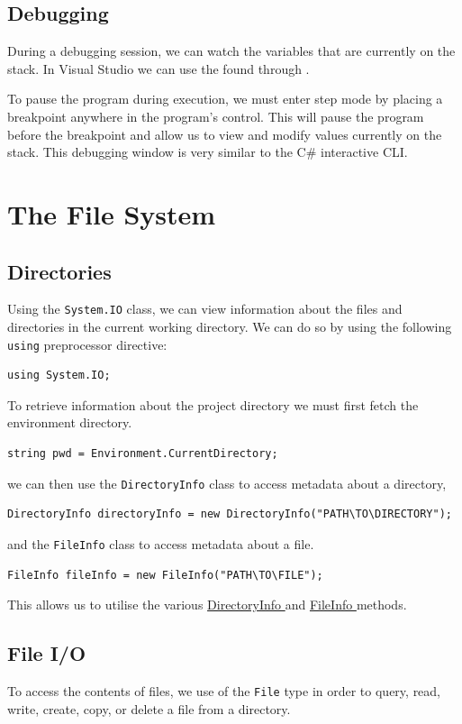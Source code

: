 \documentclass{article}
\begin{document}
\subsection{Debugging}
During a debugging session, we can watch the variables that are currently on the stack.
In Visual Studio we can use the  found through
.

To pause the program during execution, we must enter step mode by placing a breakpoint
anywhere in the program's control. This will pause the program before the breakpoint
and allow us to view and modify values currently on the stack. This debugging window
is very similar to the C\# interactive CLI. %
\section{The File System}
\subsection{Directories}
Using the \lstinline{System.IO} class, we can view information about the files and directories in
the current working directory. We can do so by using the following \lstinline{using} preprocessor directive:
\begin{lstlisting}[numbers=none]
using System.IO;
\end{lstlisting}
To retrieve information about the project directory we must first fetch the environment directory.
\begin{lstlisting}[numbers=none]
string pwd = Environment.CurrentDirectory;
\end{lstlisting}
we can then use the \lstinline{DirectoryInfo} class to access metadata about a directory,
\begin{lstlisting}[numbers=none]
DirectoryInfo directoryInfo = new DirectoryInfo("PATH\TO\DIRECTORY");
\end{lstlisting}
and the \lstinline{FileInfo} class to access metadata about a file.
\begin{lstlisting}[numbers=none]
FileInfo fileInfo = new FileInfo("PATH\TO\FILE");
\end{lstlisting}
This allows us to utilise the various \href{https://docs.microsoft.com/en-us/dotnet/api/system.io.directoryinfo?view=net-6.0#methods}{DirectoryInfo }
and \href{https://docs.microsoft.com/en-us/dotnet/api/system.io.fileinfo?view=net-6.0#methods}{FileInfo } methods.
\subsection{File I/O}
To access the contents of files, we use of the \lstinline{File} type in order to query, read, write, create, copy, or delete a
file from a directory.
\end{document}
